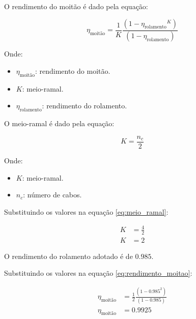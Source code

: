 
O rendimento do moitão é dado pela equação:

\begin{equation}
  \eta_{\text{moitão}} = \frac{1}{K}\frac{\left(1-{\eta_{\text{rolamento}}}^K\right)}{\left(1-\eta_{\text{rolamento}}\right)}
  \label{eq:rendimento_moitao}
\end{equation}

Onde:

\begin{itemize}[leftmargin=1.25cm]
  \item $\eta_{\text{moitão}}$: rendimento do moitão.
  \item $K$: meio-ramal.
  \item $\eta_{\text{rolamento}}$: rendimento do rolamento.
\end{itemize}

\vspace{1em}

O meio-ramal é dado pela equação:

\begin{equation}
  K = \frac{n_c}{2}
  \label{eq:meio_ramal}
\end{equation}

Onde:

\begin{itemize}[leftmargin=1.25cm]
  \item $K$: meio-ramal.
  \item $n_c$: número de cabos.
\end{itemize}

\vspace{1em}

Substituindo os valores na equação \eqref{eq:meio_ramal}:

\begin{align*}
  K & = \frac{4}{2} \\
  K & = \boxed{2}
\end{align*}

O rendimento do rolamento adotado é de $\num{0.985}$.

Substituindo os valores na equação \eqref{eq:rendimento_moitao}:

\begin{align*}
  \eta_{\text{moitão}} & = \frac{1}{2}\frac{\left(1-\num{0.985}^2\right)}{\left(1-\num{0.985}\right)} \\
  \eta_{\text{moitão}} & = \boxed{\num{0.9925}}
\end{align*}
